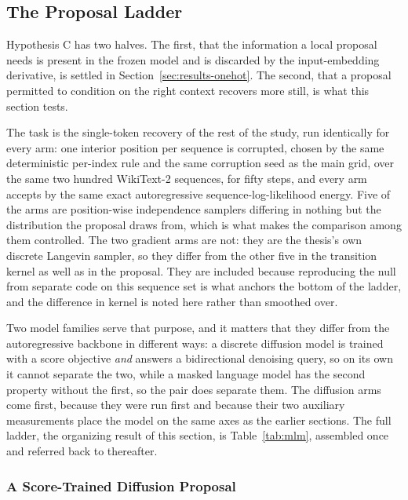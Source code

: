 \subsection{The Proposal Ladder}
\label{sec:results-ladder}

Hypothesis C has two halves. The first, that the information a local proposal needs is present in the frozen model and is discarded by the input-embedding derivative, is settled in Section~\ref{sec:results-onehot}. The second, that a proposal permitted to condition on the right context recovers more still, is what this section tests.

The task is the single-token recovery of the rest of the study, run identically for every arm: one interior position per sequence is corrupted, chosen by the same deterministic per-index rule and the same corruption seed as the main grid, over the same two hundred WikiText-2 sequences, for fifty steps, and every arm accepts by the same exact autoregressive sequence-log-likelihood energy. Five of the arms are position-wise independence samplers differing in nothing but the distribution the proposal draws from, which is what makes the comparison among them controlled. The two gradient arms are not: they are the thesis's own discrete Langevin sampler, so they differ from the other five in the transition kernel as well as in the proposal. They are included because reproducing the null from separate code on this sequence set is what anchors the bottom of the ladder, and the difference in kernel is noted here rather than smoothed over.

Two model families serve that purpose, and it matters that they differ from the autoregressive backbone in different ways: a discrete diffusion model is trained with a score objective \emph{and} answers a bidirectional denoising query, so on its own it cannot separate the two, while a masked language model has the second property without the first, so the pair does separate them. The diffusion arms come first, because they were run first and because their two auxiliary measurements place the model on the same axes as the earlier sections. The full ladder, the organizing result of this section, is Table~\ref{tab:mlm}, assembled once and referred back to thereafter.

\subsubsection{A Score-Trained Diffusion Proposal}
\label{sec:results-diffusion}

